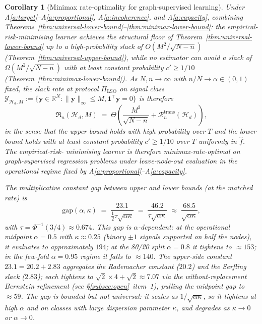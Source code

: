 \documentclass[11pt,a4paper]{article}
\theoremstyle{plain}
\newtheorem{corollary}[theorem]{Corollary}
\theoremstyle{definition}
\theoremstyle{remark}
\newcommand{\by}{\mathbf{y}}
\newcommand{\bone}{\mathbf{1}}
\newcommand{\R}{\mathbb{R}}
\newcommand{\Hcal}{\mathcal{H}}
\newcommand{\Ycal}{\mathcal{Y}}
\newcommand{\frR}{\mathfrak{R}}
\begin{document}
\begin{corollary}[Minimax rate-optimality for graph-supervised learning]
\label{cor:minimax-rate-optimality}
Under A\ref{a:target}--A\ref{a:proportional},
A\ref{a:incoherence}, and A\ref{a:capacity}, combining
Theorems~\ref{thm:universal-lower-bound}--\ref{thm:minimax-lower-bound}:
the empirical-risk-minimising learner achieves the structural floor
of Theorem~\ref{thm:universal-lower-bound} up to a
\emph{high-probability slack} of $O(M^2/\sqrt{N-n})$
(Theorem~\ref{thm:universal-upper-bound}), while no estimator can
avoid a slack of $\Omega(M^2/\sqrt{N-n})$ \emph{with at least
constant probability $c' \ge 1/10$} (Theorem~\ref{thm:minimax-lower-bound}).
As $N, n \to \infty$ with $n/N \to \alpha \in (0, 1)$ fixed, the
slack rate at protocol $\Pi_{\mathrm{LSO}}$ on signal class
$\Ycal_{\Hcal_d, M} := \{\by \in \R^N : \|\by\|_\infty \le M,
\bone^\top \by = 0\}$ is therefore
\begin{equation}
    \frR_n(\Hcal_d, M)
    \;=\; \Theta\!\left(\frac{M^2}{\sqrt{N - n}}
        + \mathcal{R}^{\mathrm{trans}}_n(\Hcal_d)\right),
    \label{eq:cramer-rao-rate}
\end{equation}
in the sense that the upper bound holds with high probability over
$T$ and the lower bound holds with at least constant probability
$c' \ge 1/10$ over $T$ uniformly in $\hat f$.  The empirical-risk-%
minimising learner is therefore \emph{minimax-rate-optimal} on
graph-supervised regression problems under leave-node-out
evaluation in the operational regime fixed by
A\ref{a:proportional}--A\ref{a:capacity}.

The multiplicative constant gap between upper and lower bounds (at
the matched rate) is
\begin{equation}
    \mathrm{gap}(\alpha, \kappa)
    \;=\; \frac{23.1}{\tfrac{1}{2}\tau\sqrt{\alpha \kappa}}
    \;=\; \frac{46.2}{\tau\sqrt{\alpha \kappa}}
    \;\approx\; \frac{68.5}{\sqrt{\alpha \kappa}},
    \label{eq:cramer-rao-gap}
\end{equation}
with $\tau = \Phi^{-1}(3/4) \approx 0.674$.  This gap is
$\alpha$-dependent: at the operational midpoint $\alpha = 0.5$
with $\kappa \approx 0.25$ (binary $\pm 1$ signals supported on
half the nodes), it evaluates to approximately $194$; at the 80/20
split $\alpha = 0.8$ it tightens to $\approx 153$; in the few-fold
$\alpha = 0.95$ regime it falls to $\approx 140$.  The upper-side
constant $23.1 = 20.2 + 2.83$ aggregates the
\citet{ElYanivPechyony2006} Rademacher constant ($20.2$) and the
Serfling slack ($2.83$); each tightens to
$\sqrt{2} \times 4 + \sqrt 2 \approx 7.07$ via the
\citet{BardenetMaillard2015} without-replacement Bernstein
refinement (see \S\ref{subsec:open}~item~1), pulling the midpoint
gap to $\approx 59$.  The gap is bounded but not universal: it
scales as $1/\sqrt{\alpha\kappa}$, so it tightens at high $\alpha$
and on classes with large dispersion parameter $\kappa$, and
degrades as $\kappa \to 0$ or $\alpha \to 0$.
\end{corollary}
\end{document}
